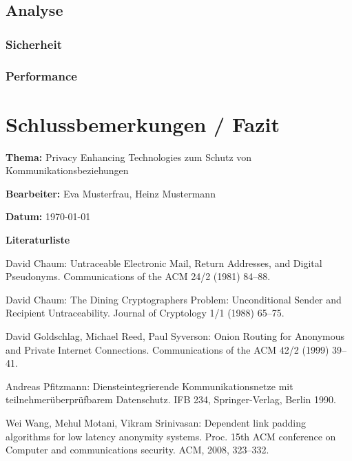 \documentclass[
    fontsize=12pt,
    headings=small,
    parskip=half,           %
    bibliography=totoc,
    numbers=noenddot,       %
    open=any,               %
    ]{scrreprt}
\begin{document}
\section{Analyse}
\subsection{Sicherheit}
\subsection{Performance}




\chapter{Schlussbemerkungen / Fazit}


\newpage
\thispagestyle{empty}
\label{sec:literaturliste}
\par\textbf{\textsf{Thema:}} Privacy Enhancing Technologies zum Schutz von Kommunikationsbeziehungen
\par\textbf{\textsf{Bearbeiter:}} Eva Musterfrau, Heinz Mustermann
\par\textbf{\textsf{Datum:}} \today
\bigskip
\par\textbf{\Large\textsf{Literaturliste}}

David Chaum: Untraceable Electronic Mail, Return Addresses, and Digital Pseudonyms. Communications of the ACM 24/2 (1981) 84--88.

David Chaum: The Dining Cryptographers Problem: Unconditional Sender and Recipient Untraceability. Journal of Cryptology 1/1 (1988) 65--75.

David Goldschlag, Michael Reed, Paul Syverson: Onion Routing for Anonymous and Private Internet Connections. Communications of the ACM 42/2 (1999) 39--41.

Andreas Pfitzmann: Diensteintegrierende Kommunikationsnetze mit teilnehmerüberprüfbarem Datenschutz. IFB 234, Springer-Verlag, Berlin 1990.

Wei Wang, Mehul Motani, Vikram Srinivasan: Dependent link padding algorithms for low latency anonymity systems. Proc. 15th ACM conference on Computer and communications security. ACM, 2008, 323--332.
\end{document}
